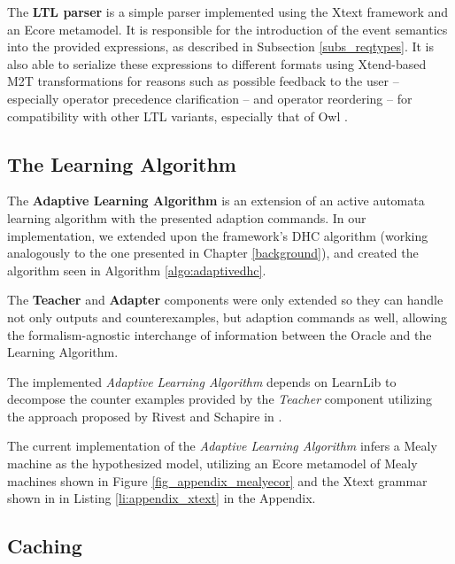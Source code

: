 The \textbf{LTL parser} is a simple parser implemented using the Xtext framework and an Ecore metamodel. It is responsible for the introduction of the event semantics into the provided expressions, as described in Subsection \ref{subs_reqtypes}. It is also able to serialize these expressions to different formats using Xtend-based M2T transformations for reasons such as possible feedback to the user -- especially operator precedence clarification -- and operator reordering -- for compatibility with other LTL variants, especially that of Owl \cite{Owl}.  

\subsection{The Learning Algorithm} \label{subsec_adaptivedhc}

The \textbf{Adaptive Learning Algorithm} is an extension of an active automata learning algorithm with the presented adaption commands. In our implementation, we extended upon the framework's DHC algorithm (working analogously to the one presented in Chapter \ref{background}), and created the algorithm seen in Algorithm \ref{algo:adaptivedhc}. 

The \textbf{Teacher} and \textbf{Adapter} components were only extended so they can handle not only outputs and counterexamples, but adaption commands as well, allowing the formalism-agnostic interchange of information between the Oracle and the Learning Algorithm.

The implemented \textit{Adaptive Learning Algorithm} depends on LearnLib\cite{10.1007/978-3-319-21690-4_32} to decompose the counter examples provided by the \textit{Teacher} component utilizing the approach proposed by Rivest and Schapire in \cite{rivest1993inference}.

The current implementation of the \textit{Adaptive Learning Algorithm} infers a Mealy machine as the hypothesized model, utilizing an Ecore metamodel of Mealy machines shown in Figure \ref{fig_appendix_mealyecor} and the Xtext grammar shown in in Listing \ref{li:appendix_xtext} in the Appendix.



\subsection{Caching} \label{subsec_memoization}


